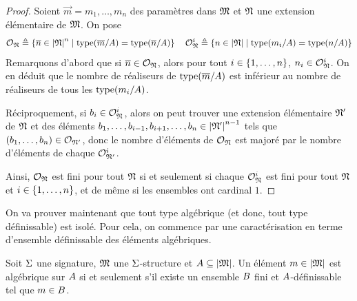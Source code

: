 \begin{proof}
  Soient $\vec m = m_1,\ldots,m_n$ des paramètres dans $\mathfrak{M}$ et
  $\mathfrak{N}$ une extension élémentaire de $\mathfrak{M}$. On pose
  \[\mathcal{O}_{\mathfrak{N}} \triangleq
  \left\{ \overline{n} \in \left\vert \mathfrak{N}\right\vert^n \;\middle\vert\; \operatorname{type}(\overline{m}/A) = \operatorname{type}(\overline{n}/A) \right\}
  \quad\mathcal{O}_{\mathfrak{N}}^i \triangleq
  \left\{ n \in \left\vert \mathfrak{N}\right\vert \;\middle\vert\; \operatorname{type}(m_i/A) = \operatorname{type}(n/A) \right\}\]
  Remarquons d'abord que si $\overline{n} \in \mathcal{O}_{\mathfrak{N}}$, alors pour tout
  $i\in\{1,\ldots,n\}$, $n_i \in \mathcal{O}^i_{\mathfrak{N}}$. On en déduit que le nombre
  de réaliseurs de $\operatorname{type}(\overline{m}/A)$ est inférieur au nombre de réaliseurs
  de tous les $\operatorname{type}(m_i/A)$.

  Réciproquement, si $b_i \in \mathcal{O}^i_{\mathfrak{N}}$, alors on peut trouver une
  extension élémentaire $\mathfrak{N}'$ de $\mathfrak{N}$ et des éléments
  $b_1,\ldots,b_{i-1},b_{i+1},\ldots,b_n \in \left\vert \mathfrak{N}'\right\vert^{n-1}$
  tels que $(b_1,\ldots,b_n)\in \mathcal{O}_{\mathfrak{N}'}$, donc le nombre d'éléments de
  $\mathcal{O}_{\mathfrak{N}}$ est majoré par le nombre d'éléments de chaque
  $\mathcal{O}^i_{\mathfrak{N}'}$.

  Ainsi, $\mathcal{O}_{\mathfrak{N}}$ est fini pour tout $\mathfrak{N}$ si et seulement si
  chaque $\mathcal{O}_{\mathfrak{N}}^i$ est fini pour tout $\mathfrak{N}$ et
  $i\in\{1,\ldots,n\}$, et de même si les ensembles ont cardinal $1$.
\end{proof}

On va prouver maintenant que tout type algébrique (et donc, tout type
définissable) est isolé. Pour cela, on commence par une caractérisation en
terme d'ensemble définissable des éléments algébriques.

\begin{lemma}
  Soit $\Sigma$ une signature, $\mathfrak{M}$ une $\Sigma$-structure et
  $A\subseteq\left\vert \mathfrak{M}\right\vert$. Un élément $m\in\left\vert \mathfrak{M}\right\vert$ est algébrique sur $A$
  si et seulement s'il existe un ensemble $B$ fini et
  $A$-définissable tel que $m\in B$.
\end{lemma}

